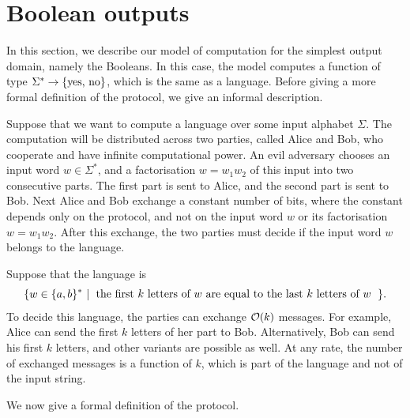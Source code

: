 
\section{Boolean outputs}
\label{sec:boolean-domain}
In this section, we describe our model of computation for the simplest output domain, namely the Booleans. In this case, the model computes a function of type $\Sigma^* \to \{\text{yes, no}\}$, which is the same as a language. Before giving a more formal definition of the protocol, we give an informal description.

Suppose that we want to compute a language over some input alphabet $\Sigma$. The computation will be distributed across two parties, called Alice and Bob, who cooperate and have infinite computational power. An evil adversary chooses an input word $w \in \Sigma^*$, and a factorisation $w = w_1 w_2$ of this input into two consecutive parts. The first part is sent to Alice, and the second part is sent to Bob. Next Alice and Bob exchange a constant number of bits, where the constant depends only on the protocol, and not on the input word $w$ or its factorisation $w=w_1 w_2$. After this exchange, the two parties must decide if the input word $w$ belongs to the language. 

\begin{myexample}
Suppose that the language is 
\begin{align*}
\setbuild{ w \in \set{a,b}^*}{the first $k$ letters of $w$ are equal to the last $k$ letters of $w$}.
\end{align*}
To decide this language, the parties can exchange ${\mathcal O}(k)$ messages. For example, Alice can send the first $k$ letters of her part to Bob. Alternatively, Bob can send his first $k$ letters, and other variants are possible as well. At any rate, the number of exchanged messages is a function of $k$, which is part of the language and not of the input string. 
\end{myexample}


We now give a formal definition of the protocol. 

